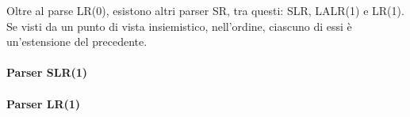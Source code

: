 \documentclass{subfiles}
\begin{document}
Oltre al parse LR(0), esistono altri parser SR, tra questi: SLR, LALR(1) e LR(1).
Se visti da un punto di vista insiemistico, nell'ordine, ciascuno di essi è un'estensione del precedente.

\paragraph{Parser SLR(1)}


\paragraph{Parser LR(1)}

\end{document}
